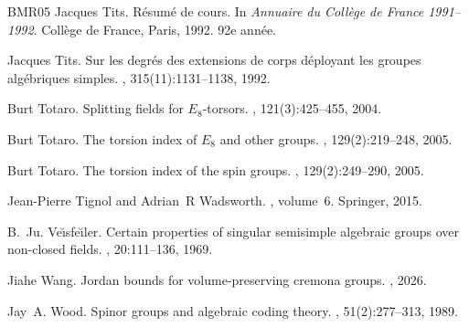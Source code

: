 \documentclass[12pt]{amsart}
\numberwithin{equation}{section}
\theoremstyle{remark}
\begin{document}
\begin{thebibliography}{BMR05}
Jacques Tits.
\newblock R{\'e}sum{\'e} de cours.
\newblock In {\em Annuaire du Coll{\`e}ge de France 1991--1992}. Coll{\`e}ge de France, Paris, 1992.
\newblock 92e ann{\'e}e.

Jacques Tits.
\newblock Sur les degr\'{e}s des extensions de corps d\'{e}ployant les groupes alg\'{e}briques simples.
, 315(11):1131--1138, 1992.

Burt Totaro.
\newblock Splitting fields for {$E_8$}-torsors.
, 121(3):425--455, 2004.

Burt Totaro.
\newblock The torsion index of {$E_8$} and other groups.
, 129(2):219--248, 2005.

Burt Totaro.
\newblock The torsion index of the spin groups.
, 129(2):249--290, 2005.

Jean-Pierre Tignol and Adrian~R Wadsworth.
, volume~6.
\newblock Springer, 2015.

B.~Ju. Ve{\u{\i}}sfe{\u{\i}}ler.
\newblock Certain properties of singular semisimple algebraic groups over non-closed fields.
, 20:111--136, 1969.

Jiahe Wang.
\newblock Jordan bounds for volume-preserving cremona groups.
, 2026.

Jay~A. Wood.
\newblock Spinor groups and algebraic coding theory.
, 51(2):277--313, 1989.

\end{thebibliography}
\end{document}

